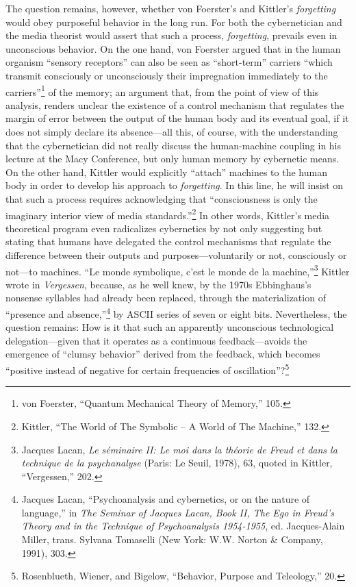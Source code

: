 \documentclass{tufte-handout}
\begin{document}
The question remains, however, whether von Foerster's and Kittler's
\emph{forgetting} would obey purposeful behavior in the long run. For
both the cybernetician and the media theorist would assert that such a
process, \emph{forgetting}, prevails even in unconscious behavior. On
the one hand, von Foerster argued that in the human organism ``sensory
receptors'' can also be seen as ``short-term'' carriers ``which transmit
consciously or unconsciously their impregnation immediately to the
carriers''\footnote{von Foerster, ``Quantum Mechanical Theory of
  Memory,'' 105.} of the memory; an argument that, from the point of
view of this analysis, renders unclear the existence of a control
mechanism that regulates the margin of error between the output of the
human body and its eventual goal, if it does not simply declare its
absence---all this, of course, with the understanding that the
cybernetician did not really discuss the human-machine coupling in his
lecture at the Macy Conference, but only human memory by cybernetic
means. On the other hand, Kittler would explicitly ``attach'' machines
to the human body in order to develop his approach to \emph{forgetting}.
In this line, he will insist on that such a process requires
acknowledging that ``consciousness is only the imaginary interior view
of media standards.''\footnote{Kittler, ``The World of The Symbolic -- A
  World of The Machine,'' 132.} In other words, Kittler's media
theoretical program even radicalizes cybernetics by not only suggesting
but stating that humans have delegated the control mechanisms that
regulate the difference between their outputs and purposes---voluntarily
or not, consciously or not---to machines. ``Le monde symbolique, c'est
le monde de la machine,''\footnote{Jacques Lacan, \emph{Le séminaire II:
  Le moi dans la théorie de Freud et dans la technique de la
  psychanalyse} (Paris: Le Seuil, 1978), 63, quoted in Kittler,
  ``Vergessen,'' 202.} Kittler wrote in \emph{Vergessen}, because, as he
well knew, by the 1970s Ebbinghaus's nonsense syllables had already been
replaced, through the materialization of ``presence and
absence,''\footnote{Jacques Lacan, ``Psychoanalysis and cybernetics, or
  on the nature of language,'' in \emph{The Seminar of Jacques Lacan,
  Book II, The Ego in Freud's Theory and in the Technique of
  Psychoanalysis 1954-1955}, ed. Jacques-Alain Miller, trans. Sylvana
  Tomaselli (New York: W.W. Norton \& Company, 1991), 303.} by ASCII
series of seven or eight bits. Nevertheless, the question remains: How
is it that such an apparently unconscious technological
delegation---given that it operates as a continuous feedback---avoids
the emergence of ``clumsy behavior'' derived from the feedback, which
becomes ``positive instead of negative for certain frequencies of
oscillation''?\footnote{Rosenblueth, Wiener, and Bigelow, ``Behavior,
  Purpose and Teleology,'' 20.}
\end{document}
